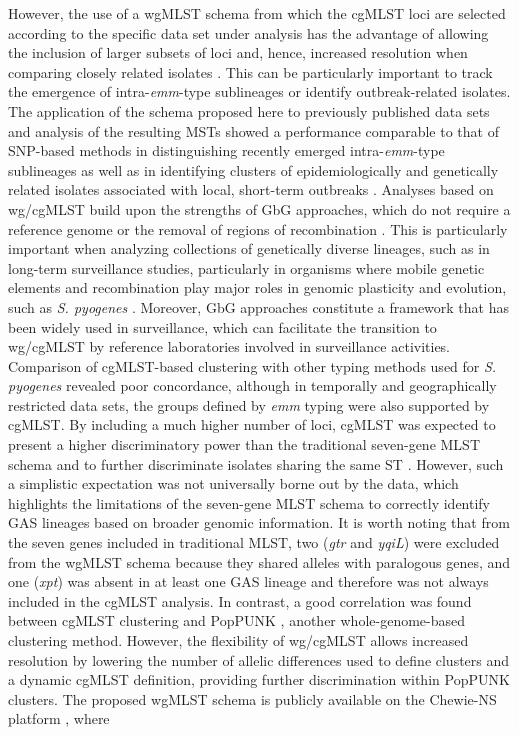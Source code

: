 However, the use of a \ac{wgMLST} schema from which the \ac{cgMLST} loci are selected according to the speciﬁc data set under analysis has the advantage of allowing the inclusion of larger subsets of loci and, hence, increased resolution when comparing closely related isolates \cite{maiden_mlst_2013}. This can be particularly important to track the emergence of intra-\textit{emm}-type sublineages or identify outbreak-related isolates. The application of the schema proposed here to previously published data sets and analysis of the resulting \ac{MST}s showed a performance comparable to that of \ac{SNP}-based methods in distinguishing recently emerged intra-\textit{emm}-type sublineages as well as in identifying clusters of epidemiologically and genetically related isolates associated with local, short-term outbreaks \cite{turner_emergence_2015, lynskey_emergence_2019, coelho_genomic_2019}. Analyses based on \ac{wg/cgMLST} build upon the strengths of \ac{GbG} approaches, which do not require a reference genome or the removal of regions of recombination \cite{maiden_mlst_2013, neumann_core_2019, leopold_bacterial_2014}. This is particularly important when analyzing collections of genetically diverse lineages, such as in long-term surveillance studies, particularly in organisms where mobile genetic elements and recombination play major roles in genomic plasticity and evolution, such as \textit{S. pyogenes} \cite{davies_atlas_2019, mcgregor_multilocus_2004}. Moreover, \ac{GbG} approaches constitute a framework that has been widely used in surveillance, which can facilitate the transition to \ac{wg/cgMLST} by reference laboratories involved in surveillance activities. Comparison of \ac{cgMLST}-based clustering with other typing methods used for \textit{S. pyogenes} revealed poor concordance, although in temporally and geographically restricted data sets, the groups deﬁned by \textit{emm} typing were also supported by \ac{cgMLST}. By including a much higher number of loci, \ac{cgMLST} was expected to present a higher discriminatory power than the traditional seven-gene \ac{MLST} schema and to further discriminate isolates sharing the same \ac{ST} \cite{neumann_core_2019, bletz_defining_2018}. However, such a simplistic expectation was not universally borne out by the data, which highlights the limitations of the seven-gene \ac{MLST} schema to correctly identify \ac{GAS} lineages based on broader genomic information. It is worth noting that from the seven genes included in traditional \ac{MLST}, two (\textit{gtr} and \textit{yqiL}) were excluded from the \ac{wgMLST} schema because they shared alleles with paralogous genes, and one (\textit{xpt}) was absent in at least one \ac{GAS} lineage and therefore was not always included in the \ac{cgMLST} analysis. In contrast, a good correlation was found between \ac{cgMLST} clustering and \ac{PopPUNK} \cite{davies_atlas_2019, lees_fast_2019}, another whole-genome-based clustering method. However, the ﬂexibility of \ac{wg/cgMLST} allows increased resolution by lowering the number of allelic differences used to deﬁne clusters and a dynamic \ac{cgMLST} deﬁnition, providing further discrimination within \ac{PopPUNK} clusters. The proposed \ac{wgMLST} schema is publicly available on the \ac{Chewie-NS} platform \cite{mamede_chewie_2021}, where 